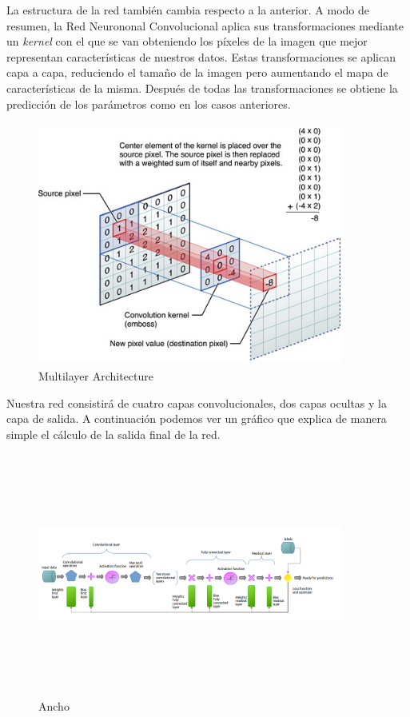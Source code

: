 \documentclass{article}
\begin{document}
La estructura de la red también cambia respecto a la anterior. A modo de resumen, la Red Neurononal Convolucional \cite{RNC} aplica sus transformaciones mediante un \textit{kernel} con el que se van obteniendo los píxeles de la imagen que mejor representan características de nuestros datos. Estas transformaciones se aplican capa a capa, reduciendo el tamaño de la imagen pero aumentando el mapa de características de la misma. Después de todas las transformaciones se obtiene la predicción de los parámetros como en los casos anteriores.

\begin{figure}[H]
  \centering
  \includegraphics[width=100mm, height=80mm]{images/conv_nn_squema.jpg}
  \caption{Multilayer Architecture}
\end{figure}

Nuestra red consistirá de cuatro capas convolucionales, dos capas ocultas y la capa de salida. A continuación podemos ver un gráfico que explica de manera simple el cálculo de la salida final de la red.

\begin{figure}[H]
  \centering
  \includegraphics[width=100mm, height=80mm]{images/conv_nn.png}
  \caption{Ancho}
\end{figure}
\end{document}
